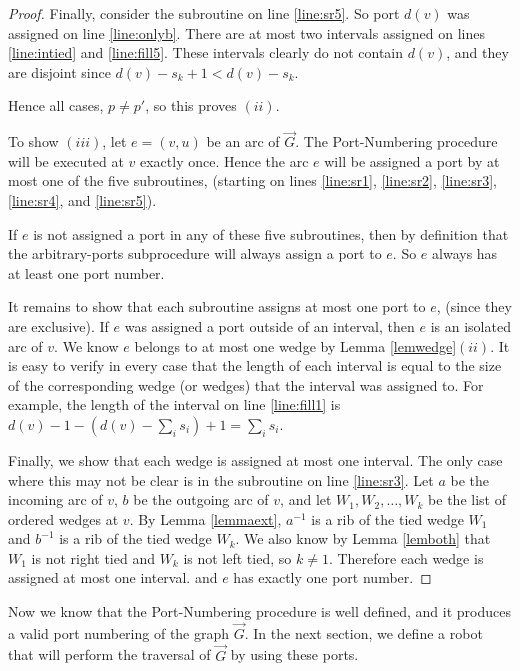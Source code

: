\documentclass[12pt,letterpaper,oneside]{book}
\begin{document}
\begin{proof}
Finally, consider the subroutine on line \ref{line:sr5}.  So port $d(v)$ was assigned on line \ref{line:onlyb}.  There are 
at most two intervals assigned on lines \ref{line:intied} and \ref{line:fill5}.  These intervals clearly do not 
contain $d(v)$, and they are disjoint since $d(v)-s_k+1<d(v)-s_k$.  



Hence all cases, $p\ne p'$, so this proves $(ii)$.

To show $(iii)$, let $e=(v,u)$ be an arc of $\vec{G}$.  The Port-Numbering procedure will be executed at $v$ exactly once.  Hence the 
arc $e$ will be assigned a port by at most one of the five subroutines, 
(starting on lines \ref{line:sr1}, \ref{line:sr2}, \ref{line:sr3}, \ref{line:sr4}, and \ref{line:sr5}).  %

If $e$ is not assigned a port in any of these five subroutines, then by definition that the 
arbitrary-ports subprocedure will always assign a port to $e$.  So $e$ always has at least one port number.


It remains to show that each subroutine assigns at most one port to $e$, (since they are exclusive).   
If 
$e$ was assigned a port outside of an interval, then $e$ is an isolated arc of $v$.  
We know $e$ belongs to at most one wedge by Lemma \ref{lemwedge}$(ii)$.  It is 
easy to verify in every case that the length of each interval is equal to the size of the corresponding wedge (or wedges) that the interval 
was assigned to.  For example, the length of the interval on line \ref{line:fill1} is $d(v)-1 -(d(v) - \sum_i s_i) +1 = \sum_i s_i$.  

Finally, we show that each wedge is assigned at most one interval.  The only case where this may not be clear is in the subroutine 
on line \ref{line:sr3}.  
Let $a$ be the incoming arc of $v$, $b$ be the 
outgoing arc of $v$, and let $W_1,W_2,\ldots,W_k$ be the list of ordered wedges at 
$v$.  %
By Lemma \ref{lemmaext}, $a^{-1}$ is a rib of the tied wedge $W_1$ and $b^{-1}$ is a rib of the tied wedge $W_k$.  
We also know by Lemma \ref{lemboth} that $W_1$ is not right tied and $W_k$ is not left tied, so $k\ne 1$.    Therefore each wedge is 
assigned at most one interval.   and $e$ has exactly one port number.  

\end{proof}


Now we know that the Port-Numbering procedure is well defined, and it produces a valid port numbering of the graph $\vec{G}$.  In the next section, 
we define a robot that will perform the traversal of $\vec{G}$ by using these ports.  
\end{document}

